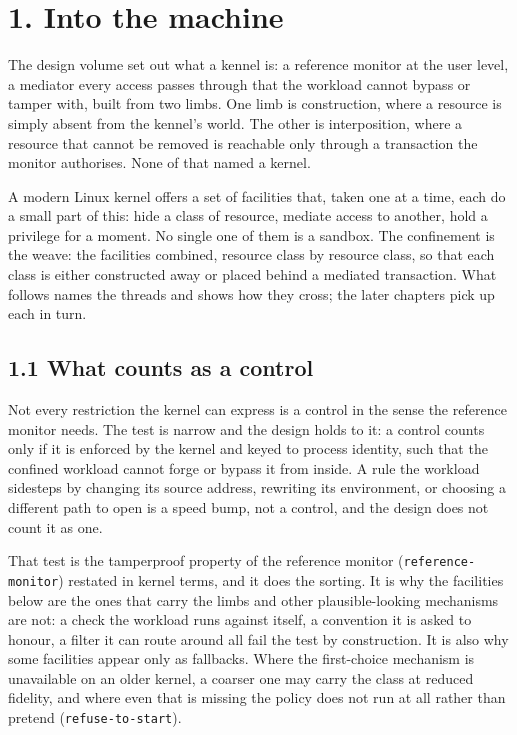 \hypertarget{into-the-machine}{%
\chapter{1. Into the machine}\label{into-the-machine}}

The design volume set out what a kennel is: a reference monitor at the
user level, a mediator every access passes through that the workload
cannot bypass or tamper with, built from two limbs. One limb is
construction, where a resource is simply absent from the kennel's world.
The other is interposition, where a resource that cannot be removed is
reachable only through a transaction the monitor authorises. None of
that named a kernel.

A modern Linux kernel offers a set of facilities that, taken one at a
time, each do a small part of this: hide a class of resource, mediate
access to another, hold a privilege for a moment. No single one of them
is a sandbox. The confinement is the weave: the facilities combined,
resource class by resource class, so that each class is either
constructed away or placed behind a mediated transaction. What follows
names the threads and shows how they cross; the later chapters pick up
each in turn.

\hypertarget{what-counts-as-a-control}{%
\section{1.1 What counts as a control}\label{what-counts-as-a-control}}

Not every restriction the kernel can express is a control in the sense
the reference monitor needs. The test is narrow and the design holds to
it: a control counts only if it is enforced by the kernel and keyed to
process identity, such that the confined workload cannot forge or bypass
it from inside. A rule the workload sidesteps by changing its source
address, rewriting its environment, or choosing a different path to open
is a speed bump, not a control, and the design does not count it as one.

That test is the tamperproof property of the reference monitor
(\texttt{reference-monitor}) restated in kernel terms, and it does the
sorting. It is why the facilities below are the ones that carry the
limbs and other plausible-looking mechanisms are not: a check the
workload runs against itself, a convention it is asked to honour, a
filter it can route around all fail the test by construction. It is also
why some facilities appear only as fallbacks. Where the first-choice
mechanism is unavailable on an older kernel, a coarser one may carry the
class at reduced fidelity, and where even that is missing the policy
does not run at all rather than pretend (\texttt{refuse-to-start}).

